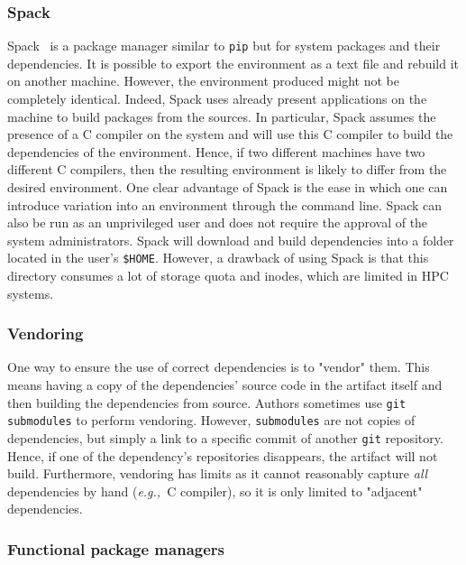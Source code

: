 \documentclass[sigconf,natbib=false]{acmart}
\newcommand{\eg}{\emph{e.g.,}}
\begin{document}
\subsubsection{Spack}

Spack\ \cite{gamblin_spack_2015} is a package manager similar to \texttt{pip} but for system packages and their dependencies.
It is possible to export the environment as a text file and rebuild it on another machine.
However, the environment produced might not be completely identical.
Indeed, Spack uses already present applications on the machine to build packages from the sources.
In particular, Spack assumes the presence of a C compiler on the system and will use this C compiler to build the dependencies of the environment.
Hence, if two different machines have two different C compilers, then the resulting environment is likely to differ from the desired environment.
One clear advantage of Spack is the ease in which one can introduce variation into an environment through the command line.
Spack can also be run as an unprivileged user and does not require the approval of the system administrators.
Spack will download and build dependencies into a folder located in the user's \texttt{\$HOME}.
However, a drawback of using Spack is that this directory consumes a lot of storage quota and inodes, which are limited in HPC systems.

\subsubsection{Vendoring}

One way to ensure the use of correct dependencies is to "vendor" them.
This means having a copy of the dependencies' source code in the artifact itself and then building the dependencies from source.
Authors sometimes use \texttt{git submodules} to perform vendoring.
However, \texttt{submodules} are not copies of dependencies, but simply a link to a specific commit of another \texttt{git} repository.
Hence, if one of the dependency's repositories disappears, the artifact will not build.
Furthermore, vendoring has limits as it cannot reasonably capture \emph{all} dependencies by hand (\eg\ C compiler), so it is only limited to "adjacent" dependencies.

\subsubsection{Functional package managers}
\end{document}
